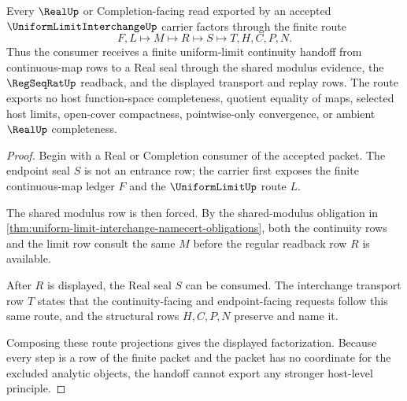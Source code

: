 \begin{theorem}
\label{thm:uniform-limit-interchange-real-seal-handoff}
Every $\RealUp$ or Completion-facing read exported by an accepted $\UniformLimitInterchangeUp$ carrier factors through the finite route
$$
F,L \longmapsto M \longmapsto R \longmapsto S \longmapsto T,H,C,P,N .
$$
Thus the consumer receives a finite uniform-limit continuity handoff from continuous-map rows to a Real seal through the shared modulus evidence, the $\RegSeqRatUp$ readback, and the displayed transport and replay rows. The route exports no host function-space completeness, quotient equality of maps, selected host limits, open-cover compactness, pointwise-only convergence, or ambient $\RealUp$ completeness.
\end{theorem}
\begin{proof}
Begin with a Real or Completion consumer of the accepted packet. The endpoint seal $S$ is not an entrance row; the carrier first exposes the finite continuous-map ledger $F$ and the $\UniformLimitUp$ route $L$.

The shared modulus row is then forced. By the shared-modulus obligation in \autoref{thm:uniform-limit-interchange-namecert-obligations}, both the continuity rows and the limit row consult the same $M$ before the regular readback row $R$ is available.

After $R$ is displayed, the Real seal $S$ can be consumed. The interchange transport row $T$ states that the continuity-facing and endpoint-facing requests follow this same route, and the structural rows $H,C,P,N$ preserve and name it.

Composing these route projections gives the displayed factorization. Because every step is a row of the finite packet and the packet has no coordinate for the excluded analytic objects, the handoff cannot export any stronger host-level principle.
\end{proof}

